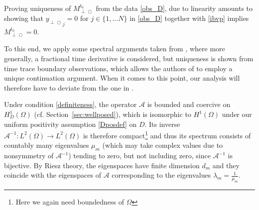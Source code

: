 \documentclass{ws-m3as}
\def\Mpp{M_{\perp\!\!\!\!\!\bigcirc}}
\def\yp{y_{\perp\!\!\!\!\!\bigcirc}}
\begin{document}
Proving uniqueness of $\Mpp^{t_0}$ from the data \eqref{obs_D}, due to linearity amounts to showing that ${\yp}_j=0$ for $j\in\{1,\ldots N\}$ in \eqref{obs_D} together with \eqref{ibvp} implies $\Mpp^{t_0}=0$.

To this end, we apply some spectral arguments taken from \cite{JiangLiPauronYamamoto2023}, where more generally, a fractional time derivative is considered, but uniqueness is shown from time trace boundary observations, which allows the authors of \cite{JiangLiPauronYamamoto2023} to employ a unique continuation argument. When it comes to this point, our analysis will therefore have to deviate from the one in \cite{JiangLiPauronYamamoto2023}.

Under condition \eqref{definiteness}, the operator $\mathcal{A}$ is bounded and coercive on $H_D^1(\Omega)$ (cf. Section~\ref{sec:wellposed}), which is isomorphic to $H^1(\Omega)$ under our uniform positivity assumption \eqref{Dposdef} on $D$. 
Its inverse $\mathcal{A}^{-1}:L^2(\Omega)\to L^2(\Omega)$ is therefore compact\footnote{Here we again need boundedness of $\Omega$} and thus 
its spectrum consists of countably many eigenvalues $\mu_m$ (which may take complex values due to nonsymmetry of $\mathcal{A}^{-1}$) tending to zero, but not including zero, since  $\mathcal{A}^{-1}$ is bijective. By Riesz theory, the eigenspaces have finite dimension $d_m$ and they coincide with the eigenspaces of $\mathcal{A}$ corresponding to the eigenvalues $\lambda_m=\frac{1}{\mu_m}$.
\end{document}

